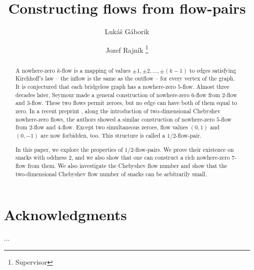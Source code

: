 \documentclass{svk_en}
\begin{document}
\title{Constructing flows from flow-pairs}

\author{Lukáš Gáborik
\and 
Jozef Rajník
\thanks{Supervisor}}





\maketitle

\begin{abstract}
A nowhere-zero $k$-flow is a mapping of values $\pm 1, \pm 2, \dots, \pm(k-1)$ to edges satisfying Kirchhoff's law -- the inflow is the same as the outflow -- for every vertex of the graph. It is conjectured \cite{tutte} that each bridgeless graph has a nowhere-zero $5$-flow. Almost three decades later, Seymour \cite{seymour} made a general construction of nowhere-zero $6$-flow from $2$-flow and $3$-flow. These two flows permit zeroes, but no edge can have both of them equal to zero. In a recent preprint \cite{chebyshev_flows_preprint}, along the introduction of two-dimensional Chebyshev nowhere-zero flows, the authors showed a similar construction of nowhere-zero $5$-flow from $2$-flow and $4$-flow. Except two simultaneous zeroes, flow values $(0, 1)$ and $(0, -1)$ are now forbidden, too. This structure is called a $1/2$-flow-pair.

In this paper, we explore the properties of $1/2$-flow-pairs. We prove their existence on snarks with oddness $2$, and we also show that one can construct a rich nowhere-zero $7$-flow from them. We also investigate the Chebyshev flow number and show that the two-dimensional Chebyshev flow number of snarks can be arbitrarily small.
\end{abstract}

\section*{Acknowledgments}
...

\nocite{*}



\end{document}
